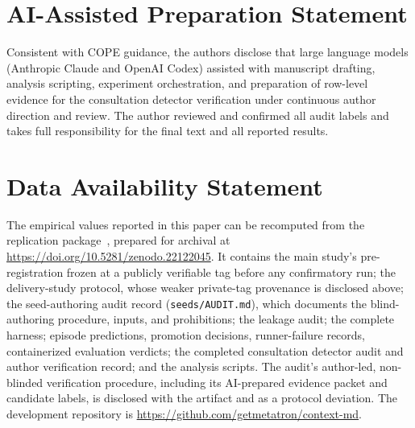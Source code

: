 \documentclass[sigconf,screen]{acmart}
\newcommand{\artifact}{\url{https://github.com/getmetatron/context-md}}
\newcommand{\artifactdoi}{\url{https://doi.org/10.5281/zenodo.22122045}}
\begin{document}
\section*{AI-Assisted Preparation Statement}
Consistent with COPE guidance, the authors disclose that large language models
(Anthropic Claude and OpenAI Codex) assisted with manuscript drafting, analysis
scripting, experiment orchestration, and preparation of row-level evidence for
the consultation detector verification under continuous author direction and
review. The author reviewed and confirmed all audit labels and takes full
responsibility for the final text and all reported results.

\balance
\section*{Data Availability Statement}
The empirical values reported in this paper can be recomputed from the replication
package~\cite{artifact}, prepared for archival at \artifactdoi. It contains the
main study's pre-registration frozen at a publicly verifiable tag before any
confirmatory run; the delivery-study protocol, whose weaker private-tag provenance
is disclosed above; the seed-authoring audit record (\texttt{seeds/AUDIT.md}),
which documents the blind-authoring procedure, inputs, and prohibitions; the
leakage audit; the complete harness; episode predictions, promotion decisions,
runner-failure records, containerized evaluation verdicts; the completed
consultation detector audit and author verification record; and the analysis
scripts. The audit's author-led, non-blinded verification procedure, including
its AI-prepared evidence packet and candidate labels, is disclosed with the
artifact and as a protocol deviation. The development repository is
\artifact.
\end{document}
